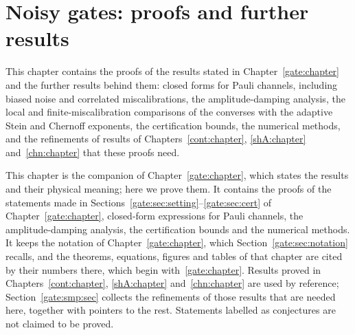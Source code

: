 \chapter{Noisy gates: proofs and further results}\label{gate:proofschapter}\label{gate:sec:proofs}
\begingroup
{}
\chapmacro{\lmin}{\lambda_{\min}}
\chapmacro{\lmax}{\lambda_{\max}}
\chapmacro{\ltil}{\tilde\lambda}

\begin{chaptersummary}
This chapter contains the proofs of the results stated in Chapter~\ref{gate:chapter} and the further results behind them: closed forms for Pauli channels, including biased noise and correlated miscalibrations, the amplitude-damping analysis, the local and finite-miscalibration comparisons of the converses with the adaptive Stein and Chernoff exponents, the certification bounds, the numerical methods, and the refinements of results of Chapters~\ref{cont:chapter}, \ref{shA:chapter} and~\ref{chn:chapter} that these proofs need.
\end{chaptersummary}

This chapter is the companion of Chapter~\ref{gate:chapter}, which states the results and their physical meaning; here we prove them. It contains the proofs of the statements made in Sections~\ref{gate:sec:setting}--\ref{gate:sec:cert} of Chapter~\ref{gate:chapter}, closed-form expressions for Pauli channels, the amplitude-damping analysis, the certification bounds and the numerical methods. It keeps the notation of Chapter~\ref{gate:chapter}, which Section~\ref{gate:sec:notation} recalls, and the theorems, equations, figures and tables of that chapter are cited by their numbers there, which begin with~\ref{gate:chapter}. Results proved in Chapters~\ref{cont:chapter}, \ref{shA:chapter} and~\ref{chn:chapter} are used by reference; Section~\ref{gate:smp:sec} collects the refinements of those results that are needed here, together with pointers to the rest. Statements labelled as conjectures are not claimed to be proved.

